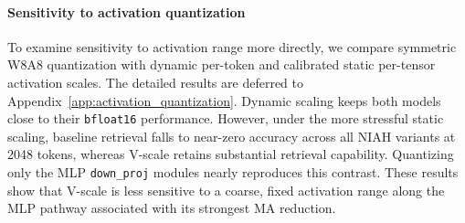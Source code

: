 \documentclass{article}
\theoremstyle{plain}
\theoremstyle{definition}
\theoremstyle{remark}
\begin{document}
\paragraph{Sensitivity to activation quantization}
To examine sensitivity to activation range more directly, we compare symmetric W8A8 quantization with dynamic per-token and calibrated static per-tensor activation scales. The detailed results are deferred to Appendix~\ref{app:activation_quantization}. Dynamic scaling keeps both models close to their \texttt{bfloat16} performance. However, under the more stressful static scaling, baseline retrieval falls to near-zero accuracy across all NIAH variants at 2048 tokens, whereas V-scale retains substantial retrieval capability. Quantizing only the MLP \texttt{down\_proj} modules nearly reproduces this contrast. These results show that V-scale is less sensitive to a coarse, fixed activation range along the MLP pathway associated with its strongest MA reduction.
\end{document}
